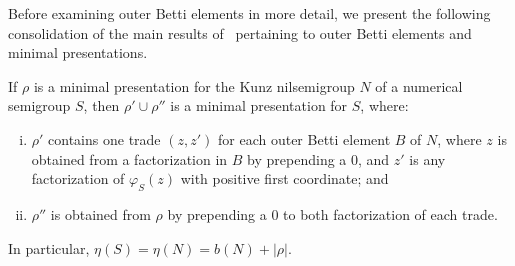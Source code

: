 \documentclass[ALCO]{cedram}
\begin{document}
Before examining outer Betti elements in more detail, we present the following consolidation of the main results of~\cite[Section~5]{kunzfaces3} pertaining to outer Betti elements and minimal presentations.  

\begin{thm}\label{t:kunzfaces3}
If $\rho$ is a minimal presentation for the Kunz nilsemigroup $N$ of a numerical semigroup $S$, then $\rho' \cup \rho''$ is a minimal presentation for $S$, where:
\begin{enumerate}[(i)]
\item
$\rho'$ contains one trade $(z, z')$ for each outer Betti element $B$ of $N$, where $z$ is obtained from a factorization in $B$ by prepending a 0, and $z'$ is any factorization of $\varphi_S(z)$ with positive first coordinate; and

\item 
$\rho''$ is obtained from $\rho$ by prepending a 0 to both factorization of each trade.  

\end{enumerate}
In particular, $\eta(S) = \eta(N) = b(N) + |\rho|$.
\end{thm}
\end{document}
